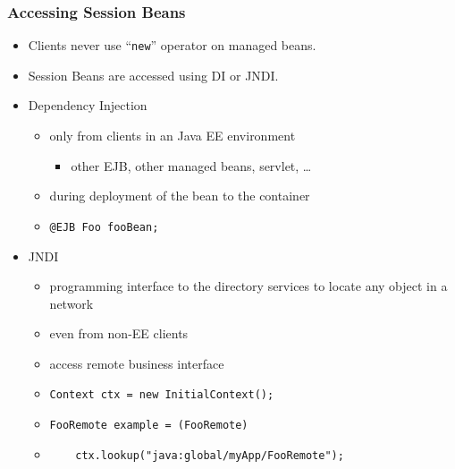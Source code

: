 \documentclass[10pt,xcolor=pdflatex]{beamer}
\begin{document}
\begin{frame}[fragile]\frametitle{Accessing Session Beans}
	\begin{itemize}
		\item Clients never use ``\texttt{new}'' operator on managed beans.
        \item Session Beans are accessed using DI or JNDI.
		\item Dependency Injection
          \begin{itemize}
        	\item only from clients in an Java EE environment
              \begin{itemize}
        		\item other EJB, other managed beans, servlet, \ldots
              \end{itemize}
            \item during deployment of the bean to the container
			\item \texttt{@EJB Foo fooBean;}
          \end{itemize}
		\item JNDI
          \begin{itemize}
        	\item programming interface to the directory services to locate any object in a network
        	\item even from non-EE clients
        	\item access remote business interface
            \item[] \texttt{Context ctx = new InitialContext();}
            \item[] \verb+FooRemote example = (FooRemote)+
            \item[] \verb+    ctx.lookup("java:global/myApp/FooRemote");+
          \end{itemize}
	\end{itemize}
\end{frame}
\end{document}
